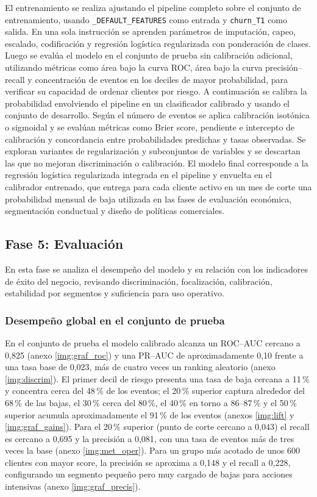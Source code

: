 El entrenamiento se realiza ajustando el pipeline completo sobre el conjunto de entrenamiento, usando \texttt{\_DEFAULT\_\hspace{0pt}FEATURES} como entrada y \texttt{churn\_\hspace{0pt}T1} como salida. En una sola instrucción se aprenden parámetros de imputación, capeo, escalado, codificación y regresión logística regularizada con ponderación de clases. Luego se evalúa el modelo en el conjunto de prueba sin calibración adicional, utilizando métricas como área bajo la curva ROC, área bajo la curva precisión–recall y concentración de eventos en los deciles de mayor probabilidad, para verificar su capacidad de ordenar clientes por riesgo. A continuación se calibra la probabilidad envolviendo el pipeline en un clasificador calibrado y usando el conjunto de desarrollo. Según el número de eventos se aplica calibración isotónica o sigmoidal y se evalúan métricas como Brier score, pendiente e intercepto de calibración y concordancia entre probabilidades predichas y tasas observadas. Se exploran variantes de regularización y subconjuntos de variables y se descartan las que no mejoran discriminación o calibración. El modelo final corresponde a la regresión logística regularizada integrada en el pipeline y envuelta en el calibrador entrenado, que entrega para cada cliente activo en un mes de corte una probabilidad mensual de baja utilizada en las fases de evaluación económica, segmentación conductual y diseño de políticas comerciales.

\subsection{Fase 5: Evaluación}

En esta fase se analiza el desempeño del modelo y su relación con los indicadores de éxito del negocio, revisando discriminación, focalización, calibración, estabilidad por segmentos y suficiencia para uso operativo.

\subsubsection{Desempeño global en el conjunto de prueba}

En el conjunto de prueba el modelo calibrado alcanza un ROC–AUC cercano a 0{,}825 (anexo \ref{img:graf_roc}) y una PR–AUC de aproximadamente 0{,}10 frente a una tasa base de 0{,}023, más de cuatro veces un ranking aleatorio (anexo \ref{img:discrim}). El primer decil de riesgo presenta una tasa de baja cercana a 11\,\% y concentra cerca del 48\,\% de los eventos; el 20\,\% superior captura alrededor del 68\,\% de las bajas, el 30\,\% cerca del 80\,\%, el 40\,\% en torno a 86–87\,\% y el 50\,\% superior acumula aproximadamente el 91\,\% de los eventos (anexos \ref{img:lift} y \ref{img:graf_gains}). Para el 20\,\% superior (punto de corte cercano a 0{,}043) el recall es cercano a 0{,}695 y la precisión a 0{,}081, con una tasa de eventos más de tres veces la base (anexo \ref{img:met_oper}). Para un grupo más acotado de unos 600 clientes con mayor score, la precisión se aproxima a 0{,}148 y el recall a 0{,}228, configurando un segmento pequeño pero muy cargado de bajas para acciones intensivas (anexo \ref{img:graf_precis}).


